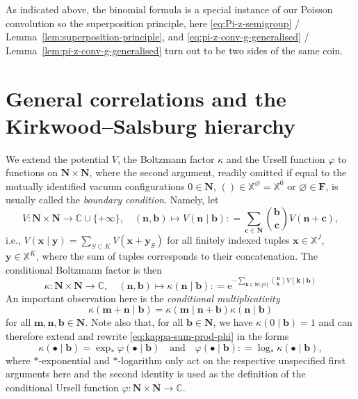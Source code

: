 \documentclass[10pt,a4paper]{amsart}
\newcommand{\e}{\mathrm{e}}
\newcommand{\C}{\mathbb{C}}
\newcommand{\X}{\mathbb X}
\newcommand{\be}{\begin{equation}}
\newcommand{\ee}{\end{equation}}
\begin{document}
As indicated above, the binomial formula is a special instance of our Poisson convolution so the superposition principle, here \eqref{eq:Pi-z-semigroup} / Lemma~\ref{lem:superposition-principle}, and \eqref{eq:pi-z-conv-g-generalised} / Lemma~\ref{lem:pi-z-conv-g-generalised} turn out to be two sides of the same coin.

\section{General correlations and the Kirkwood--Salsburg hierarchy} \label{sec:prelims-conditional-root-KS}

We extend the potential $V$, the Boltzmann factor $\kappa$ and the Ursell function $\varphi$ to functions on $\mathbf N \times \mathbf N$, where the second argument, readily omitted if equal to the mutually identified vacuum configurations $0 \in \mathbf N$, $() \in \X^\varnothing = \X^0$ or $\varnothing \in \mathbf F$, is usually called the \emph{boundary condition}. 
Namely, let
\[
	V : \mathbf N \times \mathbf N \to \C \cup \{+\infty\}, \quad (\mathbf n, \mathbf b) \mapsto V(\mathbf n \mid \mathbf b) : =  \sum_{\mathbf c \in \mathbf N} \binom{\mathbf b}{\mathbf c} V(\mathbf n + \mathbf c),
\]
i.e., $V(\mathbf x \mid \mathbf y) = \sum_{S \subset K} V(\mathbf x + \mathbf y_S)$ for all finitely indexed tuples $\mathbf x \in \X^J$, $\mathbf y \in \X^K$, where the sum of tuples corresponds to their concatenation. The conditional Boltzmann factor is then
\[
	\kappa : \mathbf N \times \mathbf N \to \C, \quad (\mathbf n, \mathbf b) \mapsto \kappa(\mathbf n \mid \mathbf b) : = \e^{- \sum_{\mathbf k \in \mathbf N \setminus \{0\}} \binom{\mathbf n}{\mathbf k} V(\mathbf k \mid \mathbf b)}
\]
An important observation here is the \emph{conditional multiplicativity}
\be \label{eq:D-kappa}
	\kappa(\mathbf m + \mathbf n \mid \mathbf b) = \kappa(\mathbf m \mid \mathbf n + \mathbf b) \kappa(\mathbf n \mid \mathbf b)
\ee
for all $\mathbf m, \mathbf n, \mathbf b \in \mathbf N$. 
Note also that, for all $\mathbf b \in \mathbf N$, we have $\kappa(0 \mid \mathbf b) = 1$ and can therefore extend and rewrite \eqref{eq:kappa-sum-prod-phi} in the forms
\be \label{eq:kappa-exp-phi-phi-log-kappa}
	\kappa(\bullet \mid \mathbf b) = \exp_\ast \varphi(\bullet \mid \mathbf b) \quad \text{and} \quad \varphi(\bullet \mid \mathbf b) : = \log_\ast \kappa(\bullet \mid \mathbf b),
\ee
where $\ast$-exponential and $\ast$-logarithm only act on the respective unspecified first arguments here and the second identity is used as the definition of the conditional Ursell function $\varphi : \mathbf N \times \mathbf N \to \C$.
\end{document}
